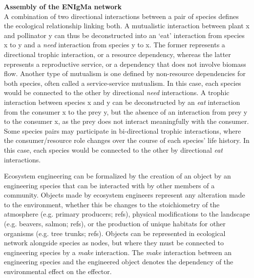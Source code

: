 \documentclass[9pt,twocolumn,twoside]{pnas-new}
\begin{document}
\noindent \textbf{Assembly of the ENIgMa network}\\
A combination of two directional interactions between a pair of species defines the ecological relationship linking both.
A mutualistic interaction between plant x and pollinator y can thus be deconstructed into an `eat' interaction from species x to y and a \emph{need} interaction from species y to x.
The former represents a directional trophic interaction, or a resource dependency, whereas the latter represents a reproductive service, or a dependency that does not involve biomass flow.
Another type of mutualism is one defined by non-resource dependencies for both species, often called a service-service mutualism.
In this case, each species would be connected to the other by directional \emph{need} interactions.
A trophic interaction between species x and y can be deconstructed by an \emph{eat} interaction from the consumer x to the prey y, but the absence of an interaction from prey y to the consumer x, as the prey does not interact meaningfully with the consumer.
Some species pairs may participate in bi-directional trophic interactions, where the consumer/resource role changes over the course of each species' life history.
In this case, each species would be connected to the other by directional \emph{eat} interactions.


Ecosystem engineering can be formalized by the creation of an object by an engineering species that can be interacted with by other members of a community.
Objects made by ecosystem engineers represent any alteration made to the environment, whether this be changes to the stoichiometry of the atmosphere (e.g. primary producers; refs), physical modifications to the landscape (e.g. beavers, salmon; refs), or the production of unique habitats for other organisms (e.g. tree trunks; refs).
Objects can be represented in ecological network alongside species as nodes, but where they must be connected to engineering species by a \emph{make} interaction.
The \emph{make} interaction between an engineering species and the engineered object denotes the dependency of the environmental effect on the effector.



\end{document}
